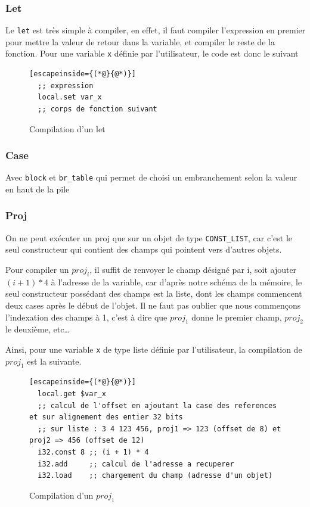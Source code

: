 \documentclass{rapportECL}
\begin{document}
\subsubsection{Let}

Le \verb|let| est très simple à compiler, en effet, il faut compiler l'expression en premier pour mettre la valeur de retour 
dans la variable, et compiler le reste de la fonction. Pour une variable \verb|x| définie par l'utilisateur, le code est donc le suivant

\begin{figure}[H]
	\begin{lstlisting}[escapeinside={(*@}{@*)}]
  ;; expression
  local.set var_x
  ;; corps de fonction suivant
	\end{lstlisting}
	\caption{Compilation d'un let}
	\label{listing:compile_let}
\end{figure}


\subsubsection{Case}

Avec \verb|block| et \verb|br_table| qui permet de choisi un embranchement selon la valeur en haut de la pile

\subsubsection{Proj}

On ne peut exécuter un proj que sur un objet de type \verb|CONST_LIST|, car c'est le seul constructeur qui contient des champs qui
pointent vers d'autres objets.

Pour compiler un $proj_i$, il suffit de renvoyer le champ désigné par i, soit ajouter $(i + 1)*4$ à l'adresse de la variable, car
d'après notre schéma de la mémoire, le seul constructeur possédant des champs est la liste, dont les champs commencent deux cases 
après le début de l'objet.
Il ne faut pas oublier que nous commençons l'indexation des champs à 1, c'est à dire que $proj_1$ donne le premier champ, 
$proj_2$ le deuxième, etc\dots

Ainsi, pour une variable \verb|x| de type liste définie par l'utilisateur, la compilation de $proj_1$ est la suivante.
\begin{figure}[H]
	\begin{lstlisting}[escapeinside={(*@}{@*)}]
  local.get $var_x
  ;; calcul de l'offset en ajoutant la case des references et sur alignement des entier 32 bits
  ;; sur liste : 3 4 123 456, proj1 => 123 (offset de 8) et proj2 => 456 (offset de 12)
  i32.const 8 ;; (i + 1) * 4
  i32.add     ;; calcul de l'adresse a recuperer
  i32.load    ;; chargement du champ (adresse d'un objet)
\end{lstlisting}
\caption{Compilation d'un $proj_1$}
\label{listing:compile_proj}
\end{figure}
\end{document}
